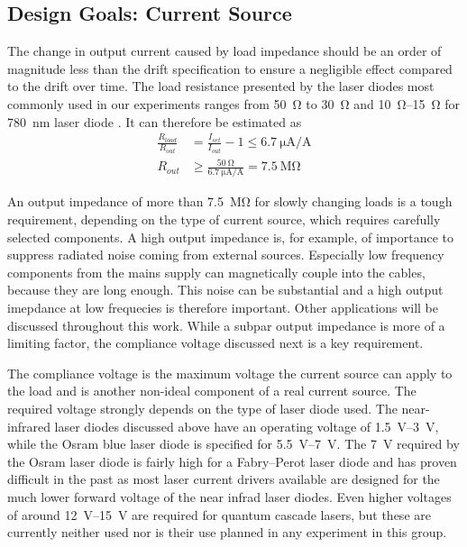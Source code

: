 \subsection{Design Goals: Current Source}
The change in output current caused by load impedance should be an order of magnitude less than the drift specification to ensure a negligible effect compared to the drift over time. The load resistance presented by the laser diodes most commonly used in our experiments ranges from \qty{50}{\ohm} \cite{datasheet_osram_pl450b} to \qty{30}{\ohm} \cite{datasheet_adl_785} and \qtyrange{10}{15}{\ohm} for \qty{780}{\nm} laser diode \cite{datasheet_sharp_780nm,datasheet_thorlabs_780nm}. It can therefore be estimated as
\begin{align}
    \frac{R_{load}}{R_{out}} &= \frac{I_{set}}{I_{out}} - 1 \leq \qty[per-mode = symbol]{6.7}{\uA \per \A} \nonumber\\
    R_{out} &\geq \frac{\qty{50}{\ohm}}{\qty[per-mode = symbol]{6.7}{\uA \per \A}} = \qty{7.5}{\mega \ohm}
\end{align}

An output impedance of more than \qty{7.5}{\mega \ohm} for slowly changing loads is a tough requirement, depending on the type of current source, which requires carefully selected components. A high output impedance is, for example, of importance to suppress radiated noise coming from external sources. Especially low frequency components from the mains supply can magnetically couple into the cables, because they are long enough. This noise can be substantial and a high output imepdance at low frequecies is therefore important. Other applications will be discussed throughout this work. While a subpar output impedance is more of a limiting factor, the compliance voltage discussed next is a key requirement.

The compliance voltage is the maximum voltage the current source can apply to the load and is another non-ideal component of a real current source. The required voltage strongly depends on the type of laser diode used. The near-infrared laser diodes discussed above have an operating voltage of \qtyrange{1.5}{3}{\V}, while the Osram  blue laser diode is specified for \qtyrange{5.5}{7}{\V}. The \qty{7}{\V} required by the Osram laser diode is fairly high for a Fabry–Perot laser diode and has proven difficult in the past \cite{thesis_baus} as most laser current drivers available are designed for the much lower forward voltage of the near infrad laser diodes. Even higher voltages of around \qtyrange{12}{15}{\V} are required for quantum cascade lasers, but these are currently neither used nor is their use planned in any experiment in this group.

